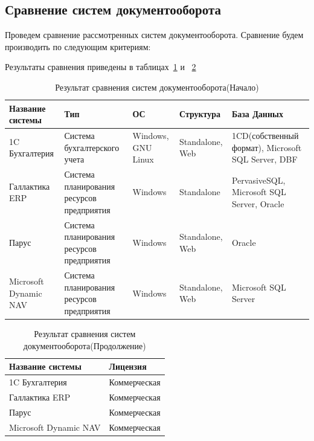 \documentclass[14pt,a4paper]{reportmod}
\begin{document}
\subsection{Сравнение систем документооборота}
Проведем сравнение рассмотренных систем документооборота. Сравнение будем производить по следующим критериям:
\setlength\itemindent{1in}
\begin{gostitemize}
\end{gostitemize}
Результаты сравнения приведены в таблицах~\ref{tabl:analys_1} и ~\ref{tabl:analys_2}
\begin{table}[ht]
  \centering
  \caption{Результат сравнения систем документооборота(Начало)}
  \label{tabl:analys_1}
\begin{tabular}{|m{3.2cm}|m{3cm}|m{2cm}|m{2.5cm}|m{4cm}|}
  \hline
  \bfseries{Название системы} &
  \bfseries{Тип} &
  \bfseries{ОС} &
  \bfseries{Структура} &
  \bfseries{База Данных}\\
  \hline
  1C Бухгалтерия & Система бухгалтерского учета & Windows, GNU Linux & Standalone, Web & 1CD(собственный формат), Microsoft SQL Server, DBF\\
  \hline
  Галлактика ERP & Система планирования ресурсов предприятия & Windows  & Standalone  & PervasiveSQL, Microsoft SQL Server, Oracle\\
  \hline
  Парус & Система планирования ресурсов предприятия & Windows & Standalone, Web & Oracle\\
  \hline
  Microsoft Dynamic NAV & Система планирования ресурсов предприятия & Windows & Standalone, Web & Microsoft SQL Server\\
  \hline
\end{tabular}
\end{table}

\begin{table}[ht]
  \centering
  \caption{Результат сравнения систем документооборота(Продолжение)}
  \label{tabl:analys_2}
\begin{tabular}{|m{6cm}|m{4cm}|}
  \hline
  \bfseries{Название системы} &
  \bfseries{Лицензия}\\
  \hline
  1C Бухгалтерия & Коммерческая\\
  \hline
  Галлактика ERP & Коммерческая\\
  \hline
  Парус & Коммерческая\\
  \hline
  Microsoft Dynamic NAV & Коммерческая\\
  \hline
\end{tabular}
\end{table}
\end{document}
